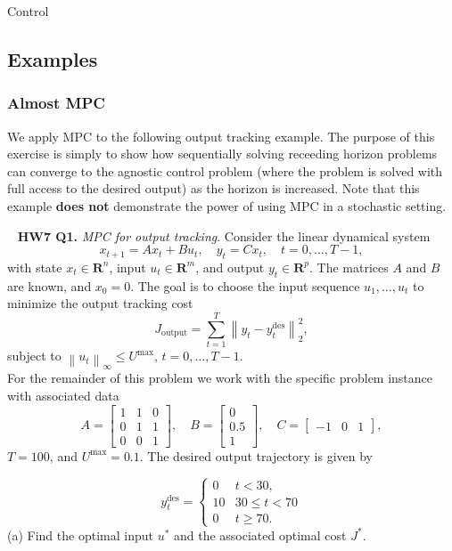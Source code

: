 \begin{chapter}{Control}
    \subsection{Examples}


    \subsubsection*{Almost MPC}
    We apply MPC to the following output tracking example. The purpose of this exercise is simply to show
    how sequentially solving receeding horizon problems can converge to the agnostic control problem (where
    the problem is solved with full access to the desired output) as the horizon is increased.
    Note that this example \textbf{does not} demonstrate the power of using MPC in a stochastic setting.

    \noindent~\cite{EE364b} \textbf{HW7 Q1.} \textit{MPC for output tracking}. Consider the linear dynamical system
    \[x_{t+1} = Ax_t + Bu_t, \quad y_t = Cx_t, \quad t = 0, \ldots, T-1,\]
    with state $x_t \in \mathbf{R}^n$, input $u_t \in \mathbf{R}^m$, and output $y_t \in \mathbf{R}^p$.
    The matrices $A$ and $B$ are known, and $x_0=0$. The goal is to choose the input sequence $u_1, \ldots, u_t$
    to minimize the output tracking cost
    \[J_{\text{output}} = \sum_{t=1}^{T}\left\lVert y_t - y_t^{\text{des}} \right\rVert_{2}^2,\]
    subject to $\left\lVert u_t \right\rVert_{\infty} \le U^{\text{max}}, \, t=0, \ldots, T-1$. \\
    For the remainder of this problem we work with the specific problem instance with associated data
    \[A = \begin{bmatrix}
        1 & 1 & 0 \\ 0 & 1 & 1 \\ 0 & 0 & 1
    \end{bmatrix}, \quad
    B = \begin{bmatrix}
        0 \\ 0.5 \\ 1
    \end{bmatrix}, \quad
    C = \begin{bmatrix}
        -1 & 0 & 1
    \end{bmatrix},\]
    $T=100$, and $U^{\text{max}} = 0.1$. The desired output trajectory is given by

    \[y^{\text{des}}_t = \begin{cases}
        0 & t < 30, \\
        10 & 30 \le t < 70 \\
        0 & t \ge 70.
    \end{cases}\]
    (a) Find the optimal input $u^*$ and the associated optimal cost $J^*$.
    

\end{chapter}
